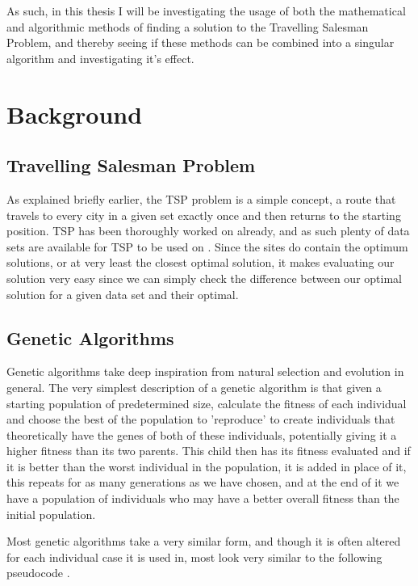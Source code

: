 \documentclass[11pt,a4paper,titlepage]{article}
\begin{document}
As such, in this thesis I will be investigating the usage of both the mathematical and algorithmic methods of finding a solution to the Travelling Salesman Problem, and thereby seeing if these methods can be combined into a singular algorithm and investigating it's effect.


\section{Background}

\subsection{Travelling Salesman Problem}
As explained briefly earlier, the TSP problem is a simple concept, a route that travels to every city in a given set exactly once and then returns to the starting position. TSP has been thoroughly worked on already, and as such plenty of data sets are available for TSP to be used on \cite{TSPRep1, TSPRep2}. Since the sites do contain the optimum solutions, or at very least the closest optimal solution, it makes evaluating our solution very easy since we can simply check the difference between our optimal solution for a given data set and their optimal.

\subsection{Genetic Algorithms}
Genetic algorithms take deep inspiration from natural selection and evolution in general. The very simplest description of a genetic algorithm is that given a starting population of predetermined size, calculate the fitness of each individual and choose the best of the population to 'reproduce' to create individuals that theoretically have the genes of both of these individuals, potentially giving it a higher fitness than its two parents. This child then has its fitness evaluated and if it is better than the worst individual in the population, it is added in place of it, this repeats for as many generations as we have chosen, and at the end of it we have a population of individuals who may have a better overall fitness than the initial population.

Most genetic algorithms take a very similar form, and though it is often altered for each individual case it is used in, most look very similar to the following pseudocode \cite{GAIntro}.
\end{document}
